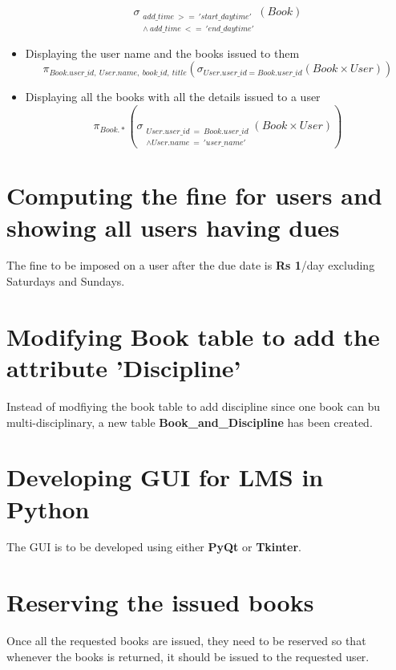 \documentclass{article}
\begin{document}
\begin{itemize}
    \[\sigma_{\substack{add\_time \ >= \ 'start\_daytime' \\ \wedge \ add\_time \ <= \ 'end\_daytime'}}(Book)\]
    \item Displaying the user name and the books issued to them
    \[\pi_{Book.user\_id,\ User.name, \ book\_id, \ title}(\sigma_{User.user\_id = Book.user\_id}(Book \times User))\]
    \item Displaying all the books with all the details issued to a user
    \[\pi_{Book.*}(\sigma_{\substack{User.user\_id \ = \ Book.user\_id \\ \wedge User.name \ = \ 'user\_name'}}(Book \times User))\]
\end{itemize}

\section{Computing the fine for users and showing all users having dues}
The fine to be imposed on a user after the due date is \textbf{Rs 1}/day excluding Saturdays and Sundays. 

\section{Modifying Book table to add the attribute 'Discipline'}
Instead of modfiying the book table to add discipline since one book can bu multi-disciplinary, a new table \textbf{\color{green}Book\_and\_Discipline} has been created. 

\section{Developing GUI for LMS in Python}
The GUI is to be developed using either \textbf{PyQt} or \textbf{Tkinter}.

\section{Reserving the issued books}
Once all the requested books are issued, they need to be reserved so that whenever the books is returned, it should be issued to the requested user. 
\end{document}
